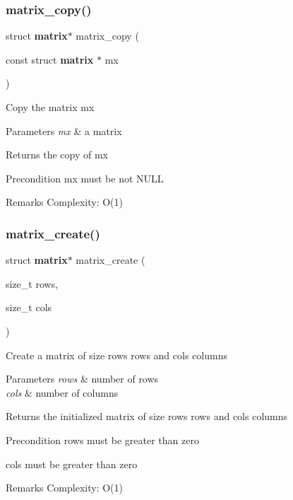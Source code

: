 \subsubsection{matrix\+\_\+copy()}
{\footnotesize\ttfamily struct \textbf{ matrix}$\ast$ matrix\+\_\+copy (\begin{DoxyParamCaption}\item[{const struct \textbf{ matrix} $\ast$}]{mx }\end{DoxyParamCaption})}

Copy the matrix {\ttfamily mx}


\begin{DoxyParams}{Parameters}
{\em mx} & a matrix \\
\hline
\end{DoxyParams}
\begin{DoxyReturn}{Returns}
the copy of {\ttfamily mx}
\end{DoxyReturn}
\begin{DoxyPrecond}{Precondition}
{\ttfamily mx} must be not N\+U\+LL
\end{DoxyPrecond}
\begin{DoxyRemark}{Remarks}
Complexity\+: O(1) 
\end{DoxyRemark}
\mbox{\label{matrix_8h_ad2d40d9c13eba774d6bb788021242a95}} 
\subsubsection{matrix\+\_\+create()}
{\footnotesize\ttfamily struct \textbf{ matrix}$\ast$ matrix\+\_\+create (\begin{DoxyParamCaption}\item[{size\+\_\+t}]{rows,  }\item[{size\+\_\+t}]{cols }\end{DoxyParamCaption})}

Create a matrix of size {\ttfamily rows} rows and {\ttfamily cols} columns


\begin{DoxyParams}{Parameters}
{\em rows} & number of rows \\
\hline
{\em cols} & number of columns\\
\hline
\end{DoxyParams}
\begin{DoxyReturn}{Returns}
the initialized matrix of size {\ttfamily rows} rows and {\ttfamily cols} columns
\end{DoxyReturn}
\begin{DoxyPrecond}{Precondition}
{\ttfamily rows} must be greater than zero 

{\ttfamily cols} must be greater than zero
\end{DoxyPrecond}
\begin{DoxyRemark}{Remarks}
Complexity\+: O(1) 
\end{DoxyRemark}
\mbox{\label{matrix_8h_a268a5429e2e4bc1664045624a82bc09c}} 
